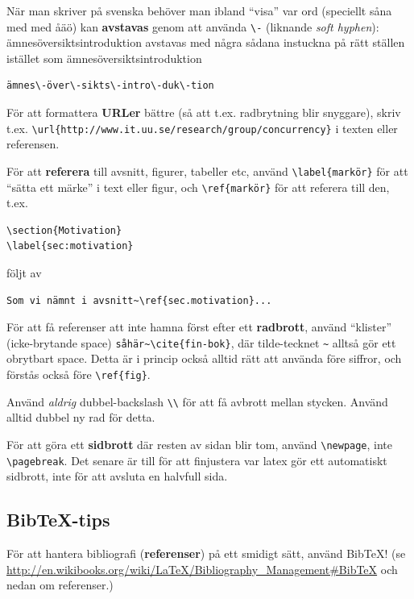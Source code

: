 \documentclass[a4paper,12pt]{article}
\begin{document}
När man skriver på svenska behöver man ibland ``visa'' var ord (speciellt såna med med åäö) kan \textbf{avstavas} genom att använda \verb|\-| (liknande \textit{soft hyphen}): ämnesöversiktsintroduktion avstavas med några sådana instuckna på rätt ställen istället som ämnes\-över\-sikts\-intro\-duk\-tion

\begin{verbatim}
ämnes\-över\-sikts\-intro\-duk\-tion
\end{verbatim}

För att formattera \textbf{URLer} bättre (så att t.ex. radbrytning blir snyggare), skriv t.ex. \verb|\url{http://www.it.uu.se/research/group/concurrency}| i texten eller referensen.

För att \textbf{referera} till avsnitt, figurer, tabeller etc, använd \verb|\label{markör}| för att ``sätta ett märke'' i text eller figur, och \verb|\ref{markör}| för att referera till den, t.ex.
\begin{verbatim}
\section{Motivation}
\label{sec:motivation}
\end{verbatim}

följt av
\begin{verbatim}
Som vi nämnt i avsnitt~\ref{sec.motivation}...
\end{verbatim}

För att få referenser att inte hamna först efter ett \textbf{radbrott}, använd ``klister'' (icke-brytande space) \verb|såhär~\cite{fin-bok}|, där tilde-tecknet \verb|~| alltså gör ett obrytbart space. Detta är i princip också alltid rätt att använda före siffror, och förstås också före \verb|\ref{fig}|.

Använd \emph{aldrig} dubbel-backslash \verb|\\| för att få avbrott mellan stycken. Använd alltid dubbel ny rad för detta.

För att göra ett \textbf{sidbrott} där resten av sidan blir tom, använd \verb|\newpage|, inte \verb|\pagebreak|. Det senare är till för att finjustera var latex gör ett automatiskt sidbrott, inte för att avsluta en halvfull sida.

\subsection{Bib\TeX-tips}

För att hantera bibliografi (\textbf{referenser}) på ett smidigt sätt, använd BibTeX! (se \url{http://en.wikibooks.org/wiki/LaTeX/Bibliography_Management#BibTeX} och nedan om referenser.)
\end{document}
